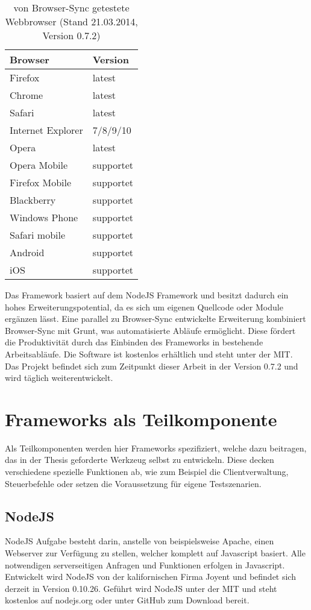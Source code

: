 		\begin{table}[H]
 		\centering
			\begin{tabular}{| p{5cm} | p{5cm} |}
			
			\hline
				Browser 	& 	Version\\
			\hline
			\hline
				Firefox	&	latest\\
				Chrome	&	latest\\
				Safari	&	latest\\
				Internet Explorer	&	7/8/9/10\\
				Opera	&	latest\\
				Opera Mobile	&	supportet\\
				Firefox Mobile	&	supportet\\
				Blackberry	&	supportet\\
				Windows Phone	&	supportet\\
				Safari mobile	&	supportet\\	
				Android	&	supportet\\
				iOS		&	supportet\\
				\hline
				\end{tabular}
			\caption{von Browser-Sync getestete \Gls{Webbrowser} (Stand 21.03.2014, Version 0.7.2)}
	\end{table}
	
	Das \Gls{Framework} basiert auf dem \gls{NodeJS} \Gls{Framework} und besitzt dadurch ein hohes Erweiterungspotential, da es sich um eigenen Quellcode oder Module ergänzen lässt. Eine parallel zu Browser-Sync entwickelte Erweiterung kombiniert Browser-Sync mit \Gls{Grunt}, was automatisierte Abläufe ermöglicht. Diese fördert die Produktivität durch das Einbinden des \Gls{Framework}s in bestehende Arbeitsabläufe. Die Software ist kostenlos erhältlich und steht unter der \Gls{MIT}. Das Projekt befindet sich zum Zeitpunkt dieser Arbeit in der Version 0.7.2 und wird täglich weiterentwickelt.

\pagebreak
\section{Frameworks als Teilkomponente}
	Als Teilkomponenten werden hier \Gls{Framework}s spezifiziert, welche dazu beitragen, das in der Thesis geforderte Werkzeug selbst zu entwickeln. Diese decken verschiedene spezielle Funktionen ab, wie zum Beispiel die Clientverwaltung, Steuerbefehle oder setzen die Voraussetzung für eigene \Gls{Test}szenarien.
	
	\subsection{\gls{NodeJS}}
	\gls{NodeJS} Aufgabe besteht darin, anstelle von beispielsweise \Gls{Apache}, einen Webserver zur Verfügung zu stellen, welcher komplett auf \Gls{Javascript} basiert. Alle notwendigen serverseitigen Anfragen und Funktionen erfolgen in \Gls{Javascript}. Entwickelt wird \gls{NodeJS} von der kalifornischen Firma Joyent und befindet sich derzeit in Version 0.10.26. Geführt wird \gls{NodeJS} unter der \Gls{MIT} und steht kostenlos auf nodejs.org oder unter GitHub zum Download bereit.
	

